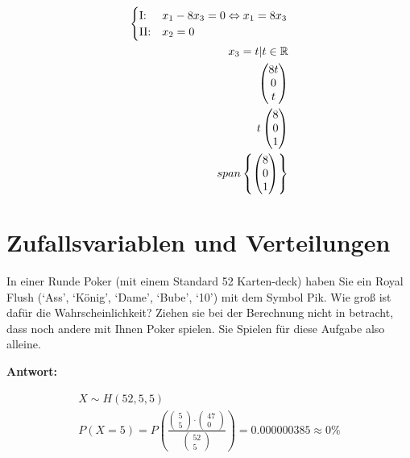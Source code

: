 \begin{align*}
    \begin{cases}
        \text{I:\@}  & x_1 -8x_3 = 0 \Leftrightarrow x_1 = 8x_3 \\
        \text{II:\@} & x_2 = 0
    \end{cases} \\
    x_3 = t | t \in \mathbb{R}                              \\
    \begin{pmatrix}
        8t \\ 0 \\ t
    \end{pmatrix}                                          \\
    t \begin{pmatrix}
          8 \\ 0 \\ 1
      \end{pmatrix}                                        \\
    span\left\{\begin{pmatrix}
                   8 \\ 0 \\ 1
               \end{pmatrix}\right\}
\end{align*}

\section{Zufallsvariablen und Verteilungen}

In einer Runde Poker (mit einem Standard 52 Karten-deck) haben Sie ein Royal
Flush (`Ass', `König', `Dame', `Bube', `10') mit dem Symbol Pik. Wie groß ist
dafür die Wahrscheinlichkeit? Ziehen sie bei der Berechnung nicht in betracht,
dass noch andere mit Ihnen Poker spielen. Sie Spielen für diese Aufgabe also
alleine.

\textbf{Antwort:}

\begin{align*}
    X \sim H(52, 5, 5) \\
    P(X = 5) = P\left(\frac{\begin{pmatrix}
                                    5 \\ 5
                                \end{pmatrix} \cdot \begin{pmatrix}
                                                        47 \\ 0
                                                    \end{pmatrix}}{\begin{pmatrix}
                                                                       52 \\ 5
                                                                   \end{pmatrix}}\right) = 0.000000385 \approx 0\%
\end{align*}

